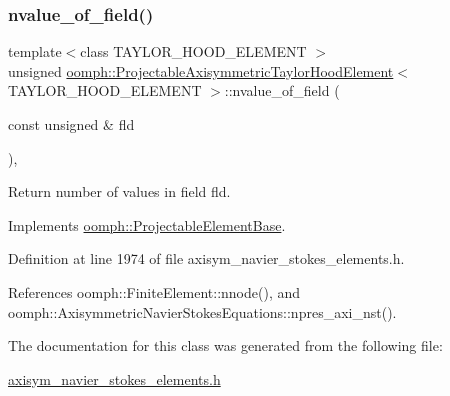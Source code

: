 \subsubsection{\texorpdfstring{nvalue\+\_\+of\+\_\+field()}{nvalue\_of\_field()}}
{\footnotesize\ttfamily template$<$class T\+A\+Y\+L\+O\+R\+\_\+\+H\+O\+O\+D\+\_\+\+E\+L\+E\+M\+E\+NT $>$ \\
unsigned \hyperlink{classoomph_1_1ProjectableAxisymmetricTaylorHoodElement}{oomph\+::\+Projectable\+Axisymmetric\+Taylor\+Hood\+Element}$<$ T\+A\+Y\+L\+O\+R\+\_\+\+H\+O\+O\+D\+\_\+\+E\+L\+E\+M\+E\+NT $>$\+::nvalue\+\_\+of\+\_\+field (\begin{DoxyParamCaption}\item[{const unsigned \&}]{fld }\end{DoxyParamCaption})\hspace{0.3cm}{\ttfamily [inline]}, {\ttfamily [virtual]}}



Return number of values in field fld. 



Implements \hyperlink{classoomph_1_1ProjectableElementBase_a1a9a6de16f3511bca8e8be770abb9c2e}{oomph\+::\+Projectable\+Element\+Base}.



Definition at line 1974 of file axisym\+\_\+navier\+\_\+stokes\+\_\+elements.\+h.



References oomph\+::\+Finite\+Element\+::nnode(), and oomph\+::\+Axisymmetric\+Navier\+Stokes\+Equations\+::npres\+\_\+axi\+\_\+nst().



The documentation for this class was generated from the following file\+:\begin{DoxyCompactItemize}
\item 
\hyperlink{axisym__navier__stokes__elements_8h}{axisym\+\_\+navier\+\_\+stokes\+\_\+elements.\+h}\end{DoxyCompactItemize}
